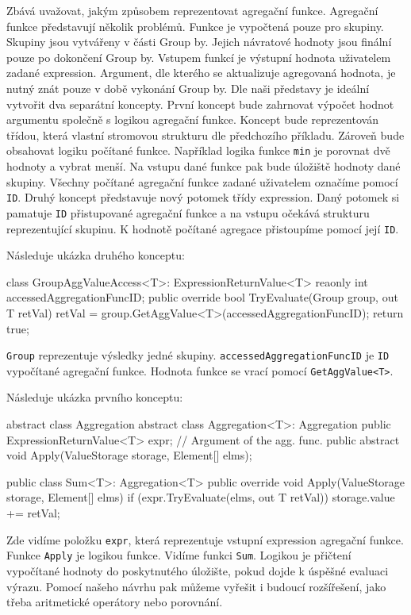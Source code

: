 Zbává uvažovat, jakým způsobem reprezentovat agregační funkce.
Agregační funkce představují několik problémů.
Funkce je vypočtená pouze pro skupiny. 
Skupiny jsou vytvářeny v části Group by.
Jejich návratové hodnoty jsou finální pouze po dokončení Group by. 
Vstupem funkcí je výstupní hodnota uživatelem zadané expression.
Argument, dle kterého se aktualizuje agregovaná hodnota, je nutný znát pouze v době vykonání Group by.
Dle naši představy je ideální vytvořit dva separátní koncepty.
První koncept bude zahrnovat výpočet hodnot argumentu společně s logikou agregační funkce.
Koncept bude reprezentován třídou, která vlastní stromovou strukturu dle předchozího příkladu.
Zároveň bude obsahovat logiku počítané funkce.
Například logika funkce \verb+min+ je porovnat dvě hodnoty a vybrat menší.
Na vstupu dané funkce pak bude úložiště hodnoty dané skupiny.
Všechny počítané agregační funkce zadané uživatelem označíme pomocí \verb+ID+.
Druhý koncept představuje nový potomek třídy expression.
Daný potomek si pamatuje \verb+ID+ přistupované agregační funkce a na vstupu očekává strukturu reprezentující skupinu.
K hodnotě počítané agregace přistoupíme pomocí její \verb+ID+.

Následuje ukázka druhého konceptu:
\begin{code}
class GroupAggValueAccess<T>: ExpressionReturnValue<T> {
  reaonly int accessedAggregationFuncID; 
  public override bool TryEvaluate(Group group, out T retVal) {
    retVal = group.GetAggValue<T>(accessedAggregationFuncID);
    return true; }}
\end{code}
\verb+Group+ reprezentuje výsledky jedné skupiny.
\verb+accessedAggregationFuncID+ je \verb+ID+ vypočítané agregační funkce.
Hodnota funkce se vrací pomocí \verb+GetAggValue<T>+.

Následuje ukázka prvního konceptu:
\begin{code}
abstract class Aggregation { }
abstract class Aggregation<T>: Aggregation {
  public ExpressionReturnValue<T> expr; // Argument of the agg. func.
  public abstract void Apply(ValueStorage storage, Element[] elms);
}

public class Sum<T>: Aggregation<T>{
  public override void Apply(ValueStorage storage, Element[] elms) {
    if (expr.TryEvaluate(elms, out T retVal)) {
      storage.value += retVal;
    }
  }
}
\end{code}
Zde vidíme položku \verb+expr+, která reprezentuje vstupní expression agregační funkce.
Funkce \verb+Apply+ je logikou funkce. 
Vidíme funkci \verb+Sum+. 
Logikou je přičtení vypočítané hodnoty do poskytnutého úložište, pokud dojde k úspěšné evaluaci výrazu.
Pomocí našeho návrhu pak můžeme vyřešit i budoucí rozšířešení, jako třeba aritmetické operátory nebo porovnání.

